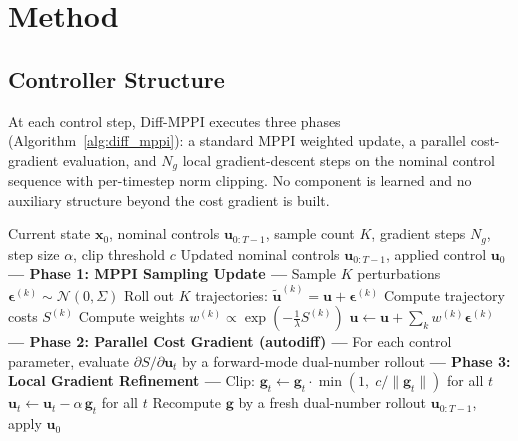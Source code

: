 \documentclass[journal]{IEEEtran}
\begin{document}
\section{Method}
\label{sec:method}

\subsection{Controller Structure}
\label{sec:controller_structure}

At each control step, Diff-MPPI executes three phases
(Algorithm~\ref{alg:diff_mppi}): a standard MPPI weighted update, a parallel
cost-gradient evaluation, and $N_g$ local gradient-descent steps on the nominal
control sequence with per-timestep norm clipping. No component is learned and no
auxiliary structure beyond the cost gradient is built.

\begin{algorithm}[t]
\caption{Diff-MPPI Controller (one control step)}
\label{alg:diff_mppi}
\begin{algorithmic}[1]
\REQUIRE Current state $\mathbf{x}_0$, nominal controls $\mathbf{u}_{0:T-1}$, sample count $K$, gradient steps $N_g$, step size $\alpha$, clip threshold $c$
\ENSURE Updated nominal controls $\mathbf{u}_{0:T-1}$, applied control $\mathbf{u}_0$
\STATE \textbf{--- Phase 1: MPPI Sampling Update ---}
\STATE Sample $K$ perturbations $\boldsymbol{\epsilon}^{(k)} \sim \mathcal{N}(0, \Sigma)$
\STATE Roll out $K$ trajectories: $\tilde{\mathbf{u}}^{(k)} = \mathbf{u} + \boldsymbol{\epsilon}^{(k)}$
\STATE Compute trajectory costs $S^{(k)}$ 
\STATE Compute weights $w^{(k)} \propto \exp(-\frac{1}{\lambda} S^{(k)})$
\STATE $\mathbf{u} \leftarrow \mathbf{u} + \sum_k w^{(k)} \boldsymbol{\epsilon}^{(k)}$
\STATE \textbf{--- Phase 2: Parallel Cost Gradient (autodiff) ---}
\STATE For each control parameter, evaluate $\partial S / \partial \mathbf{u}_t$ by a forward-mode dual-number rollout 
\STATE \textbf{--- Phase 3: Local Gradient Refinement ---}
  \STATE Clip: $\mathbf{g}_t \leftarrow \mathbf{g}_t \cdot \min(1,\; c / \|\mathbf{g}_t\|)$ for all $t$
  \STATE $\mathbf{u}_t \leftarrow \mathbf{u}_t - \alpha\, \mathbf{g}_t$ for all $t$
  \STATE Recompute $\mathbf{g}$ by a fresh dual-number rollout
\ENDFOR
\RETURN $\mathbf{u}_{0:T-1}$, apply $\mathbf{u}_0$
\end{algorithmic}
\end{algorithm}
\end{document}
